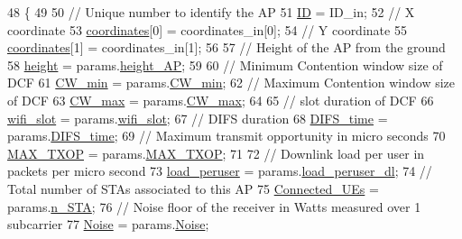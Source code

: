 \begin{DoxyCode}
48                                                                        \{
49     
50     \textcolor{comment}{// Unique number to identify the AP}
51     \hyperlink{classAP_a5f6f67357a37b369b8967ce354ede5dd}{ID} = ID\_in;
52     \textcolor{comment}{// X coordinate}
53     \hyperlink{classAP_ac52816d18c4dc26158fa3bd2e63f3bcc}{coordinates}[0] = coordinates\_in[0];
54     \textcolor{comment}{// Y coordinate}
55     \hyperlink{classAP_ac52816d18c4dc26158fa3bd2e63f3bcc}{coordinates}[1] = coordinates\_in[1];
56     
57     \textcolor{comment}{// Height of the AP from the ground}
58     \hyperlink{classAP_a27fec97f7b61e45d1350555cf62535d4}{height} = params.\hyperlink{structparameters_aeba51b77bd7d93edf7ec54d444a76e5e}{height\_AP};
59     
60     \textcolor{comment}{// Minimum Contention window size of DCF}
61     \hyperlink{classAP_a02a0d02d7725c2b4ca51a3d6a88e677e}{CW\_min} = params.\hyperlink{structparameters_a80db9f2709f397239e827974d9c6deaa}{CW\_min};
62     \textcolor{comment}{// Maximum Contention window size of DCF}
63     \hyperlink{classAP_a3351a0a344c4a96a5a185aea2609fa7c}{CW\_max} = params.\hyperlink{structparameters_a7716151437acba90b37a7de2088da9da}{CW\_max};
64     
65     \textcolor{comment}{// slot duration of DCF}
66     \hyperlink{classAP_a48aa019a03aefd3ee980a9112441234b}{wifi\_slot} = params.\hyperlink{structparameters_a771941f653f52f2c398deae9f44e82d5}{wifi\_slot};
67     \textcolor{comment}{// DIFS duration}
68     \hyperlink{classAP_a41453568719c530c6a7376273c02a6fa}{DIFS\_time} = params.\hyperlink{structparameters_adca3efd3a896aefccc975ebb57e71423}{DIFS\_time};
69     \textcolor{comment}{// Maximum transmit opportunity in micro seconds}
70     \hyperlink{classAP_a0952981af3bebf7dcc9fabe94875dc7b}{MAX\_TXOP} = params.\hyperlink{structparameters_ae7178f23f8bef3a2a715f63bfe0dd485}{MAX\_TXOP};
71     
72     \textcolor{comment}{// Downlink load per user in packets per micro second}
73     \hyperlink{classAP_a3e8b289d2aa54fd8898e145fc605907b}{load\_peruser} = params.\hyperlink{structparameters_a4785fc49f0e3c305f6a10a42fc660f01}{load\_peruser\_dl};
74     \textcolor{comment}{// Total number of STAs associated to this AP}
75     \hyperlink{classAP_af0d927a781e8776c18758508a6845c85}{Connected\_UEs} = params.\hyperlink{structparameters_aa28e7a8ab695a9bf3056dc05d5cb916d}{n\_STA};
76     \textcolor{comment}{// Noise floor of the receiver in Watts measured over 1 subcarrier}
77     \hyperlink{classAP_ae865c89ed6f1bace113d6ddb1a4f41d3}{Noise} = params.\hyperlink{structparameters_a6cf4f2d340c4d03c138cee3460f047eb}{Noise};

\end{DoxyCode}
